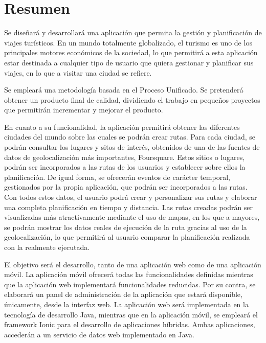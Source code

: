 \newpage
\chapter*{Resumen}
Se diseñará y desarrollará una aplicación que permita la gestión y planificación de viajes turísticos. En un mundo totalmente globalizado, el turismo es uno de los principales motores económicos de la sociedad, lo que permitirá a esta aplicación estar destinada a cualquier tipo de usuario que quiera gestionar y planificar sus viajes, en lo que a visitar una ciudad se refiere.

Se empleará una metodología basada en el Proceso Unificado. Se pretenderá obtener un producto final de calidad, dividiendo el trabajo en pequeños proyectos que permitirán incrementar y mejorar el producto.

En cuanto a su funcionalidad, la aplicación permitirá obtener las diferentes ciudades del mundo sobre las cuales se podrán crear rutas. Para cada ciudad, se podrán consultar los lugares y sitos de interés, obtenidos de una de las fuentes de datos de geolocalización más importantes, Foursquare. Estos sitios o lugares, podrán ser incorporados a las rutas de los usuarios y establecer sobre ellos la planificación. De igual forma, se ofrecerán eventos de carácter temporal, gestionados por la propia aplicación, que podrán ser incorporados a las rutas. Con todos estos datos, el usuario podrá crear y personalizar sus rutas y elaborar una completa planificación en tiempo y distancia. Las rutas creadas podrán ser visualizadas más atractivamente mediante el uso de mapas, en los que a mayores, se podrán mostrar los datos reales de ejecución de la ruta gracias al uso de la geolocalización, lo que permitirá al usuario comparar la planificación realizada con la realmente ejecutada.

El objetivo será el desarrollo, tanto de una aplicación web como de una aplicación móvil. La aplicación móvil ofrecerá todas las funcionalidades definidas mientras que la aplicación web implementará funcionalidades reducidas. Por su contra, se elaborará un panel de administración de la aplicación que estará disponible, únicamente, desde la interfaz web. La aplicación web será implementada en la tecnología de desarrollo Java, mientras que en la aplicación móvil, se empleará el framework Ionic para el desarrollo de aplicaciones híbridas. Ambas aplicaciones, accederán a un servicio de datos web implementado en Java.